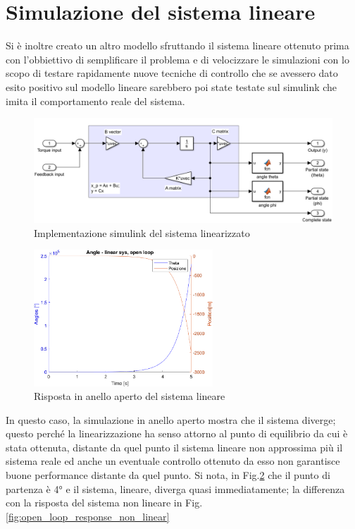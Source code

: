 \section{Simulazione del sistema lineare}
Si è inoltre creato un altro modello sfruttando il sistema lineare ottenuto prima  con l'obbiettivo di semplificare il problema e di velocizzare le simulazioni con lo scopo di testare rapidamente nuove tecniche di controllo che se avessero dato esito positivo sul modello lineare sarebbero poi state testate sul simulink che imita il comportamento reale del sistema.
\begin{figure}[H]
	\centering   	
	\includegraphics[width=1\textwidth]{Immagini/linear_system.png}
	\caption{Implementazione simulink del sistema linearizzato}
	\label{fig:linear_system}
\end{figure}

\begin{figure}[H]
	\centering   	
	\includegraphics[width=0.6\textwidth]{Immagini/linear_open_loop.png}
	\caption{Risposta in anello aperto del sistema lineare}
	\label{fig:open_loop_response}
\end{figure}
In questo caso, la simulazione in anello aperto mostra che il sistema diverge; questo perché la linearizzazione ha senso attorno al punto di equilibrio da cui è stata ottenuta, distante da quel punto il sistema lineare non approssima più il sistema reale ed anche un eventuale controllo ottenuto da esso non garantisce buone performance distante da quel punto. Si nota, in Fig.\ref{fig:open_loop_response} che il punto di partenza è 4° e il sistema, lineare, diverga quasi immediatamente; la differenza con la risposta del sistema non lineare in Fig.\ref{fig:open_loop_response_non_linear}

